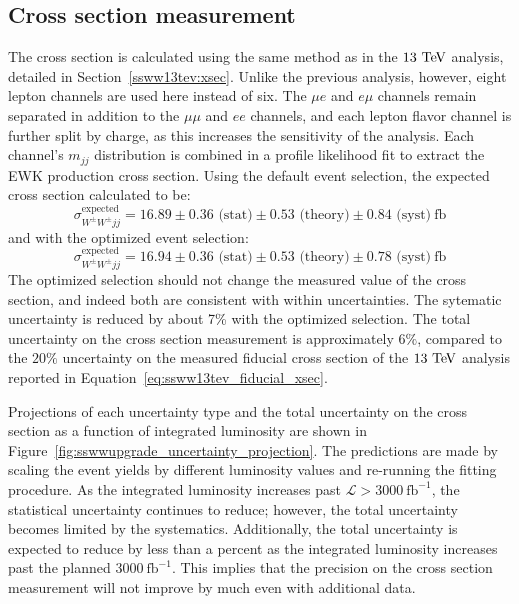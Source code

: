 \subsection{Cross section measurement}\label{sswwupgrade:results_xsec}

The cross section is calculated using the same method as in the $13\tev$ analysis, detailed in Section~\ref{ssww13tev:xsec}.
Unlike the previous analysis, however, eight lepton channels are used here instead of six.
The $\mu e$ and $e\mu$ channels remain separated in addition to the $\mu\mu$ and $ee$ channels, and each lepton flavor channel is further split by charge, as this increases the sensitivity of the analysis.
Each channel's $m_{jj}$ distribution is combined in a profile likelihood fit to extract the EWK \ssww production cross section.
Using the default event selection, the expected cross section calculated to be:
\begin{equation}
  \sigma_{W^\pm W^\pm jj}^{\textrm{expected}} = 16.89 \pm 0.36 \textrm{\ (stat)} \pm 0.53 \textrm{\ (theory)} \pm 0.84 \textrm{\ (syst)}~\textrm{fb}
  \label{eq:sswwupgrade_xsec_default}
\end{equation}
and with the optimized event selection:
\begin{equation}
    \sigma_{W^\pm W^\pm jj}^{\textrm{expected}} = 16.94 \pm 0.36 \textrm{\ (stat)} \pm 0.53 \textrm{\ (theory)} \pm 0.78 \textrm{\ (syst)}~\textrm{fb}
  \label{eq:sswwupgrade_xsec_optimized}
\end{equation}
The optimized selection should not change the measured value of the cross section, and indeed both are consistent with within uncertainties.
The sytematic uncertainty is reduced by about 7\% with the optimized selection.
The total uncertainty on the cross section measurement is approximately $6\%$, compared to the $20\%$ uncertainty on the measured fiducial cross section of the $13\tev$ analysis reported in Equation~\ref{eq:ssww13tev_fiducial_xsec}.

Projections of each uncertainty type and the total uncertainty on the cross section as a function of integrated luminosity are shown in Figure~\ref{fig:sswwupgrade_uncertainty_projection}.
The predictions are made by scaling the event yields by different luminosity values and re-running the fitting procedure.
As the integrated luminosity increases past $\mathcal{L} > 3000~\textrm{fb}^{-1}$, the statistical uncertainty continues to reduce; however, the total uncertainty becomes limited by the systematics.
Additionally, the total uncertainty is expected to reduce by less than a percent as the integrated luminosity increases past the planned $3000~\textrm{fb}^{-1}$.
This implies that the precision on the cross section measurement will not improve by much even with additional data.

